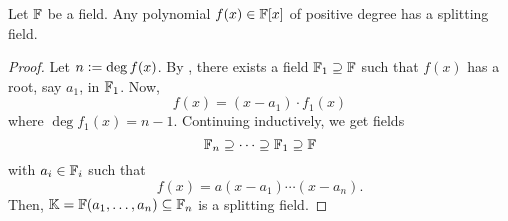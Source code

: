 \begin{theorem} \label{thm:existence-of-splitting-field}
    Let $\mathbb{F}$ be a field. Any polynomial $f(x) \in \mathbb{F}[x]$ of positive degree has a splitting field. 
\end{theorem}
\begin{proof}
    Let $n \vcentcolon= \deg f(x)$. By , there exists a field $\mathbb{F}_1 \supseteq \mathbb{F}$ such that $f(x)$ has a root, say $a_1$, in $\mathbb{F}_1$. Now, 
    \[
        f(x) = (x-a_1) \cdot f_1(x)
    \]
    where $\deg f_1(x) = n-1$. Continuing inductively, we get fields
    \[
        \mathbb{F}_n \supseteq \cdots \supseteq \mathbb{F}_1 \supseteq \mathbb{F}
    \]
    with $a_i \in \mathbb{F}_i$ such that 
    \[
        f(x) = a(x-a_1)\cdots(x-a_n).
    \]
    Then, $\mathbb{K} = \mathbb{F}(a_1, \ldots, a_n) \subseteq \mathbb{F}_n$ is a splitting field.
\end{proof}